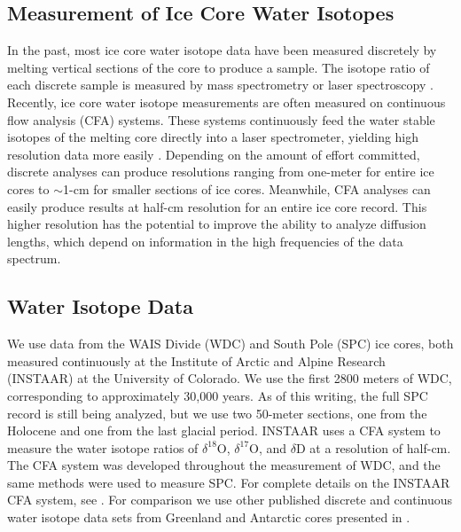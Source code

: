 \documentclass[draft, jgrga]{AGUTeX}
\begin{document}
\begin{article}
\subsection{Measurement of Ice Core Water Isotopes}

In the past, most ice core water isotope data have been measured discretely by melting vertical sections of the core to produce a sample. The isotope ratio of each discrete sample is measured by mass spectrometry or laser spectroscopy \citep{Kerstel1999, Lis2008, Gupta2009, Brand2009}. Recently, ice core water isotope measurements are often measured on continuous flow analysis (CFA) systems. These systems continuously feed the water stable isotopes of the melting core directly into a laser spectrometer, yielding high resolution data more easily \citep{Gkinis2011a,Emanuelsson2015,Jones2017b}. Depending on the amount of effort committed, discrete analyses can produce resolutions ranging from one-meter for entire ice cores to $\sim$1-cm for smaller sections of ice cores. Meanwhile, CFA analyses can easily produce results at half-cm resolution for an entire ice core record. This higher resolution has the potential to improve the ability to analyze diffusion lengths, which depend on information in the high frequencies of the data spectrum.

\subsection{Water Isotope Data}

We use data from the WAIS Divide (WDC) \citep{Jones2017b} and South Pole (SPC) \citep{Casey2014} ice cores, both measured continuously at the Institute of Arctic and Alpine Research (INSTAAR) at the University of Colorado. We use the first 2800 meters of WDC, corresponding to approximately 30,000 years. As of this writing, the full SPC record is still being analyzed, but we use two 50-meter sections, one from the Holocene and one from the last glacial period. INSTAAR uses a CFA system to measure the water isotope ratios of $\delta^{18}$O, $\delta^{17}$O, and $\delta$D at a resolution of half-cm. The CFA system was developed throughout the measurement of WDC, and the same methods were used to measure SPC. For complete details on the INSTAAR CFA system, see \citet{Jones2017b}. For comparison we use other published discrete and continuous water isotope data sets from Greenland and Antarctic cores presented in \citet{Oerter2004,Gkinis2011a,Steig2013,Svensson2015,Holme2017}.


\end{article}
\end{document}
